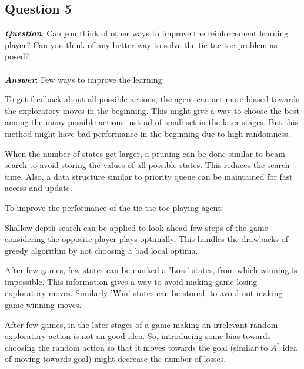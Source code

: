 \documentclass[a4paper,10pt]{report}
\newenvironment{my_itemize}{
\begin{itemize}
  \setlength{\itemsep}{1pt}
  \setlength{\parskip}{0pt}
  \setlength{\parsep}{0pt}}{
\end{itemize}}
\begin{document}
\subsection{Question 5}
\textbf{\emph{Question}}: Can you think of other ways to improve the reinforcement learning player? Can you think of any better way to solve the tic-tac-toe problem as posed?
\\\\
\textbf{\emph{Answer}}: Few ways to improve the learning:
\begin{my_itemize}
\item To get feedback about all possible actions, the agent can act more biased towards the exploratory moves in the beginning. This might give a way to choose the best among the many possible actions instead of small set in the later stages. But this method might have bad performance in the beginning due to high randomness.
\item When the number of states get larger, a pruning can be done similar to beam search to avoid storing the values of all possible states. This reduces the search time. Also, a data structure similar to priority queue can be maintained for fast access and update.\end{my_itemize}
To improve the performance of the tic-tac-toe playing agent:
\begin{my_itemize}
\item Shallow depth search can be applied to look ahead few steps of the game considering the opposite player plays optimally. This handles the drawbacks of greedy algorithm by not choosing a bad local optima.
\item After few games, few states can be marked a 'Loss' states, from which winning is impossible. This information gives a way to avoid making game losing exploratory moves. Similarly 'Win' states can be stored, to avoid not making game winning moves.
\item After few games, in the later stages of a game making an irrelevant random exploratory action is not an good idea. So, introducing some bias towards choosing the random action so that it moves towards the goal (similar to $A^{*}$ idea of moving towards goal) might decrease the number of losses.
\end{my_itemize}
\end{document}
